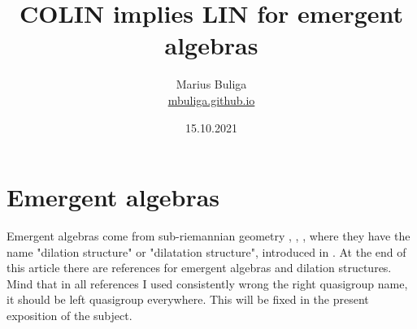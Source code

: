 \documentclass{article}
\begin{document}
\pagestyle{plain}










\newtheorem{theorem}{Theorem}[section]

\newtheorem{proposition}[theorem]{Proposition}

\newtheorem{lema}[theorem]{Lemma}

\newtheorem{corollary}[theorem]{Corollary}

\newtheorem{definition}[theorem]{Definition}

\newtheorem{remark}[theorem]{Remark}

\newtheorem{exempl}{Example}[section]

\newenvironment{example}{\begin{exempl}  \em}{\hfill $\square$

\end{exempl}}  \vspace{.5cm}









\renewcommand{\contentsname}{ }


\title{COLIN implies LIN for emergent algebras}

\author{Marius Buliga \\ \href{https://mbuliga.github.io}{mbuliga.github.io}}

\date{15.10.2021}

\maketitle



\section{Emergent algebras}

Emergent  algebras come from sub-riemannian geometry \cite{buligasub}, \cite{buligainf},  \cite{buligabraided}, where they have the name "dilation structure" or "dilatation structure", introduced in \cite{buligadil1}. 
At the end of this article there are references for emergent algebras and dilation structures. Mind that in all references I used consistently wrong the right quasigroup name, it should be left quasigroup everywhere. This will be fixed in the present exposition of the subject. 
\end{document}
